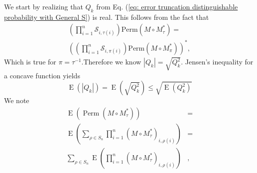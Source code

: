 \documentclass[10pt,aps,pra,twocolumn,superscriptaddress]{revtex4-2}
\DeclareMathOperator{\E}{E}
\DeclareMathOperator{\Perm}{Perm}
\begin{document}
We start by realizing that $Q_k$ from Eq. (\ref{eq: error truncation distinguishable probability with General S}) is real. This follows from the fact that 
\begin{multline}
 \left(\prod^n_{i=1}\mathcal{S}_{i,\tau(i)}\right) \text{Perm}(M \circ M^*_{\tau}) =\\
 \left(\left(\prod^n_{i=1}\mathcal{S}_{i,\pi(i)}\right) \text{Perm}(M \circ M^*_{\pi})\right)^*,   
\end{multline}
Which is true for $\pi = \tau^{-1}$.Therefore we know $|Q_k|=\sqrt{Q_k^2}$. 
Jensen's inequality for a concave function \cite{dekking_computations_2005} yields
\begin{equation}
\label{eqn:E_Q_jensen}
    \E(|Q_k|)=\E(\sqrt{Q_k^2})\leq \sqrt{\E(Q_k^2)} 
\end{equation}
We note
\begin{equation}
\begin{split}
        \E(\Perm(M\circ M_{\tau}^*))& = \\
    \E(\sum_{\rho \in S_n}\prod_{i=1}^n(M\circ M_{\tau}^*)_{i,\rho(i)})& =\\
    \sum_{\rho \in S_n}\E(\prod_{i=1}^n(M\circ M_{\tau}^*)_{i,\rho(i)})&,
    \label{E Perm M M=0}
\end{split}
\end{equation}
\end{document}
